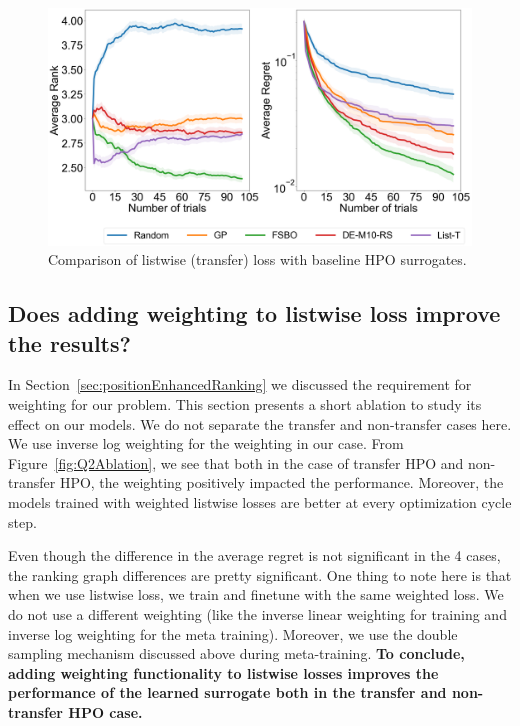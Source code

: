 \documentclass[12pt, twoside, ngerman]{report}
\begin{document}
\begin{figure}[h]
  \centering
    \includegraphics[scale=0.25]{images/Q1FinalAblation}
    \caption{Comparison of listwise (transfer) loss with baseline HPO surrogates.}
    \label{fig:Q1FinalAblation}
\end{figure}


\subsection{Does adding weighting to listwise loss improve the results?}

In Section~\ref{sec:positionEnhancedRanking} we discussed the requirement for weighting for our problem.
This section presents a short ablation to study its effect on our models.
We do not separate the transfer and non-transfer cases here.
We use inverse log weighting for the weighting in our case.
From Figure~\ref{fig:Q2Ablation}, we see that both in the case of transfer HPO and non-transfer HPO, the weighting positively impacted the performance. Moreover, the models trained with weighted listwise losses are better at every optimization cycle step.

Even though the difference in the average regret is not significant in the 4 cases,  the ranking graph differences are pretty significant. One thing to note here is that when we use listwise loss,  we train and finetune with the same weighted loss. We do not use a different weighting (like the inverse linear weighting for training and inverse log weighting for the meta training). Moreover, we use the double sampling mechanism discussed above during meta-training.
\textbf{To conclude,  adding weighting functionality to listwise losses improves the performance of the learned surrogate both in the transfer and non-transfer HPO case.}
\end{document}
